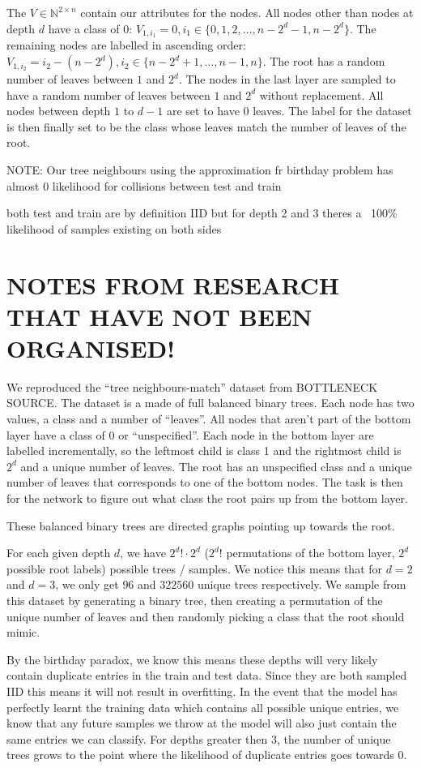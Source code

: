 \documentclass[a4paper,12pt]{article}
\begin{document}
The $V \in \mathbb{N}^{2 \times n}$ contain our attributes for the nodes. All nodes other than nodes at depth $d$ have a class of 0: $V_{1, i_{1}} = 0, i_{1} \in \{0, 1, 2, \ldots, n-2^{d}-1, n-2^{d}\}$. The remaining nodes are labelled in ascending order: $V_{1, i_{2}}= i_{2}-(n-2^{d}), i_{2} \in \{n-2^{d}+1, \ldots, n-1, n\}$.
The root has a random number of leaves between $1$ and $2^{d}$. The nodes in the last layer are sampled to have a random number of leaves between $1$ and $2^{d}$ without replacement. All nodes between depth $1$ to $d-1$ are set to have 0 leaves. The label for the dataset is then finally set to be the class whose leaves match the number of leaves of the root.

NOTE:
Our tree neighbours using the approximation fr birthday problem has almost 0 likelihood for collisions between test and train

both test and train are by definition IID but for depth 2 and 3 theres a ~100\% likelihood of samples existing on both sides


\section{NOTES FROM RESEARCH THAT HAVE NOT BEEN ORGANISED!}

We reproduced the ``tree neighbours-match'' dataset from BOTTLENECK SOURCE.
The dataset is a made of full balanced binary trees. Each node has two values, a class and a number of ``leaves''. All nodes that aren't part of the bottom layer have a class of 0 or ``unspecified''. Each node in the bottom layer are labelled incrementally, so the leftmost child is class 1 and the rightmost child is $2^{d}$ and a unique number of leaves. The root has an unspecified class and a unique number of leaves that corresponds to one of the bottom nodes. The task is then for the network to figure out what class the root pairs up from the bottom layer.

These balanced binary trees are directed graphs pointing up towards the root.

For each given depth $d$, we have $2^{d}! \cdot 2^{d}$ ($2^{d}!$ permutations of the bottom layer, $2^{d}$ possible root labels) possible trees / samples. We notice this means that for $d=2$ and $d=3$, we only get $96$ and $322560$ unique trees respectively.
We sample from this dataset by generating a binary tree, then creating a permutation of the unique number of leaves and then randomly picking a class that the root should mimic.

By the birthday paradox, we know this means these depths will very likely contain duplicate entries in the train and test data. Since they are both sampled IID this means it will not result in overfitting. In the event that the model has perfectly learnt the training data which contains all possible unique entries, we know that any future samples we throw at the model will also just contain the same entries we can classify.
For depths greater then 3, the number of unique trees grows to the point where the likelihood of duplicate entries goes towards 0.

\printbibliography
\end{document}
